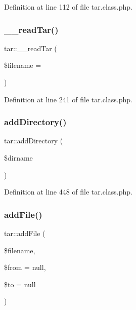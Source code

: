 Definition at line 112 of file tar.\+class.\+php.

\hypertarget{classtar_a1422972f8f5afac82f82ecab505b4079}{}\label{classtar_a1422972f8f5afac82f82ecab505b4079} 
\subsubsection{\texorpdfstring{\+\_\+\+\_\+read\+Tar()}{\_\_readTar()}}
{\footnotesize\ttfamily tar\+::\+\_\+\+\_\+read\+Tar (\begin{DoxyParamCaption}\item[{}]{\$filename = {\ttfamily \textquotesingle{}\textquotesingle{}} }\end{DoxyParamCaption})}



Definition at line 241 of file tar.\+class.\+php.

\hypertarget{classtar_a046188f5c3141d52246774c13ab2c895}{}\label{classtar_a046188f5c3141d52246774c13ab2c895} 
\subsubsection{\texorpdfstring{add\+Directory()}{addDirectory()}}
{\footnotesize\ttfamily tar\+::add\+Directory (\begin{DoxyParamCaption}\item[{}]{\$dirname }\end{DoxyParamCaption})}



Definition at line 448 of file tar.\+class.\+php.

\hypertarget{classtar_a374a307255a5fc5110749b1e37946947}{}\label{classtar_a374a307255a5fc5110749b1e37946947} 
\subsubsection{\texorpdfstring{add\+File()}{addFile()}}
{\footnotesize\ttfamily tar\+::add\+File (\begin{DoxyParamCaption}\item[{}]{\$filename,  }\item[{}]{\$from = {\ttfamily null},  }\item[{}]{\$to = {\ttfamily null} }\end{DoxyParamCaption})}




